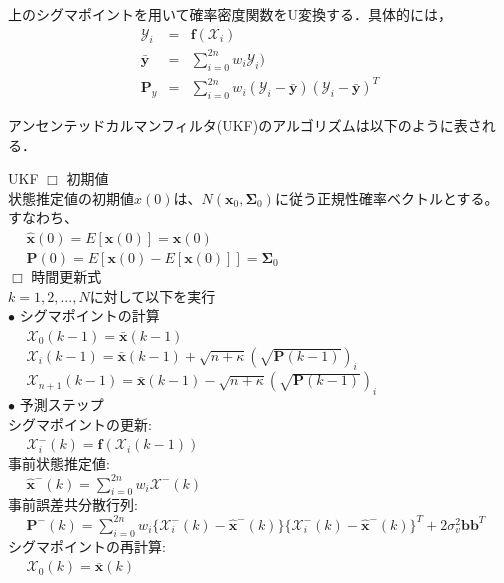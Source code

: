 \documentclass[twocolumn,oneside,a4paper]{article}
\begin{document}
上のシグマポイントを用いて確率密度関数をU変換する．具体的には，
\begin{eqnarray*}
	\mathscr{Y}_i &=& \bm{f}(\mathscr{X}_i) \\
	\bar{\bm{y}} &=& \sum_{i=0}^{2n} w_i \mathscr{Y}_i) \\
	\bm{P}_y &=& \sum_{i=0}^{2n} w_i (\mathscr{Y}_i - \bar{\bm{y}}) (\mathscr{Y}_i - \bar{\bm{y}})^{T}
\end{eqnarray*}


アンセンテッドカルマンフィルタ(UKF)のアルゴリズムは以下のように表される．

  \begin{breakitembox}[l]{UKF}
    \hspace{-0.3in} $\Box$ 初期値\\
    状態推定値の初期値$\hat{x}(0)$は、$N(\bm{x}_0,\bm{\Sigma}_0)$に従う正規性確率ベクトルとする。すなわち、\\
    $\:\:\:\:\:\: \hat{\bm{x}}(0) = E[\bm{x}(0)] = \bm{x}(0)$ \\
    $\:\:\:\:\:\: \bm{P}(0) = E[\bm{x}(0)-E[\bm{x}(0)]] = \bm{\Sigma}_0$ \\
    $\Box$ 時間更新式\\
    $k=1,2,...,N$に対して以下を実行\\
     $\bullet$ シグマポイントの計算\\
	$\:\:\:\:\:\: \mathscr{X}_0(k-1) = \bar{\bm{x}}(k-1) $\\
	$\:\:\:\:\:\: \mathscr{X}_i(k-1) = \bar{\bm{x}}(k-1) + \sqrt{n+\kappa}(\sqrt{\bm{P}(k-1)})_i $ \\
	$\:\:\:\:\:\: \mathscr{X}_{n+1}(k-1) = \bar{\bm{x}}(k-1) - \sqrt{n+\kappa}(\sqrt{\bm{P}(k-1)})_i $ \\
     $\bullet$ 予測ステップ\\
     シグマポイントの更新: \\
	$\:\:\:\:\:\: \mathscr{X}_{i}^{-}(k) = \bm{f}(\mathscr{X}_{i}(k-1)) $ \\
     事前状態推定値: \\
     $\:\:\:\:\:\: \hat{\bm{x}}^{-}(k) = \sum_{i=0}^{2n} w_i \mathscr{X}^{-}(k)$\\
     事前誤差共分散行列: \\
     $\:\:\:\:\:\: \bm{P}^{-}(k)= \sum_{i=0}^{2n} w_i \{ \mathscr{X}_i^{-}(k) - \hat{\bm{x}}^{-}(k) \} \{ \mathscr{X}_i^{-}(k) - \hat{\bm{x}}^{-}(k) \}^T + 2\sigma_v^2 \bm{b} \bm{b}^T$ \\
     シグマポイントの再計算: \\
	$\:\:\:\:\:\: \mathscr{X}_0(k) = \bar{\bm{x}}(k) $\\

\end{breakitembox}
\end{document}
